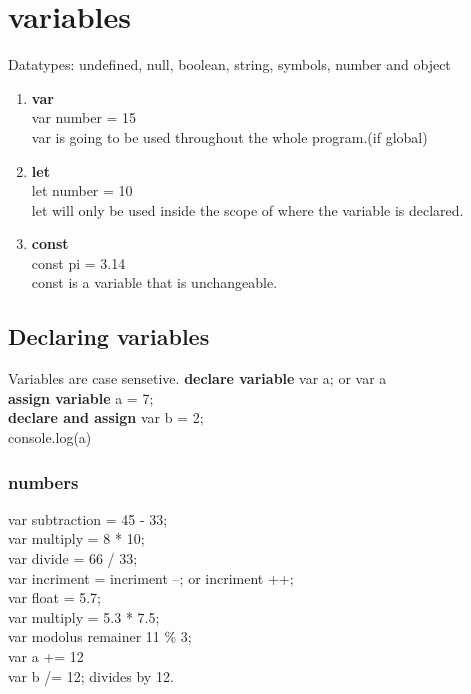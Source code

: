 \section{variables}

Datatypes: undefined, null, boolean, string, symbols, number and object\\

\begin{enumerate}
    \item \textbf{var}\\ 
    var number = 15\\
    var is going to be used throughout the whole program.(if global)\\
    \item \textbf{let}\\
    let number = 10\\
    let will only be used inside the scope of where the variable is declared.\\
    \item \textbf{const}\\
    const pi = 3.14\\
    const is a variable that is unchangeable.
    
\end{enumerate}

\subsection{Declaring variables}
Variables are case sensetive.
\textbf{declare variable} var a; or var a\\
\textbf{assign variable} a = 7; \\
\textbf{declare and assign} var b = 2;\\
console.log(a) \\

\subsubsection{numbers}
var subtraction = 45 - 33;\\
var multiply = 8 * 10;\\
var divide = 66 / 33;\\
var incriment = incriment --; or incriment ++;\\
var float = 5.7;\\
var multiply = 5.3 * 7.5;\\
var modolus remainer 11 \% 3;\\
var a += 12\\ 
var b /= 12; divides by 12.\\

